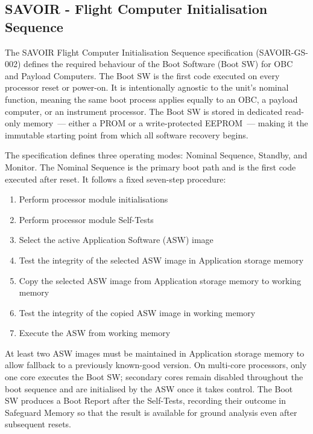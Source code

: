 \subsection{SAVOIR - Flight Computer Initialisation Sequence}
\label{subsection:bg-space-flightComputerInitialisationSequence}

The SAVOIR Flight Computer Initialisation Sequence specification \cite{SAVOIR} (SAVOIR-GS-002) defines the required behaviour of the Boot Software (Boot SW) for OBC and Payload Computers. The Boot SW is the first code executed on every processor reset or power-on. It is intentionally agnostic to the unit's nominal function, meaning the same boot process applies equally to an OBC, a payload computer, or an instrument processor. The Boot SW is stored in dedicated read-only memory~--- either a PROM or a write-protected EEPROM~--- making it the immutable starting point from which all software recovery begins.

The specification defines three operating modes: Nominal Sequence, Standby, and Monitor. The Nominal Sequence is the primary boot path and is the first code executed after reset. It follows a fixed seven-step procedure:

\begin{enumerate}
    \item Perform processor module initialisations
    \item Perform processor module Self-Tests
    \item Select the active Application Software (ASW) image
    \item Test the integrity of the selected ASW image in Application storage memory
    \item Copy the selected ASW image from Application storage memory to working memory
    \item Test the integrity of the copied ASW image in working memory
    \item Execute the ASW from working memory
\end{enumerate}

At least two ASW images must be maintained in Application storage memory to allow fallback to a previously known-good version. On multi-core processors, only one core executes the Boot SW; secondary cores remain disabled throughout the boot sequence and are initialised by the ASW once it takes control. The Boot SW produces a Boot Report after the Self-Tests, recording their outcome in Safeguard Memory so that the result is available for ground analysis even after subsequent resets.

